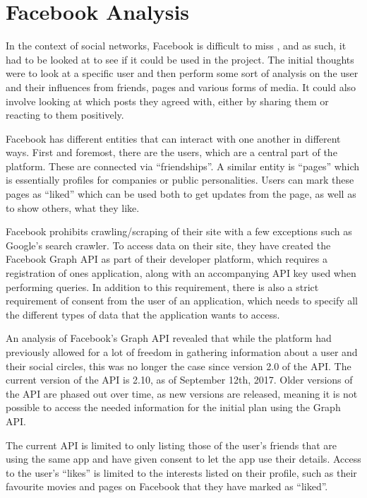 \chapter{Facebook Analysis}\label{chap:facebook-analysis}
In the context of social networks, Facebook is difficult to miss
\citep{FacebookPopularity}, and as such, it had to be looked at to see if it
could be used in the project.
The initial thoughts were to look at a specific user and then perform some sort of analysis on the user and their
influences from friends, pages and various forms of media.
It could also involve looking at which posts they agreed with, either by sharing
them or reacting to them positively.\nl

Facebook has different entities that can interact with one another in different ways.
First and foremost, there are the users, which are a central part of the
platform. These are connected via ``friendships''.
A similar entity is ``pages'' which is essentially profiles for companies or
public personalities.
Users can mark these pages as ``liked'' which can be used both to get updates
from the page, as well as to show others, what they like.\nl

Facebook prohibits crawling/scraping of their site with a few exceptions such as Google's search crawler.
To access data on their site, they have created the Facebook Graph API as part
of their developer platform, which requires a registration of ones application, along with an accompanying API key used when performing queries.
In addition to this requirement, there is also a strict requirement of consent
from the user of an application, which needs to specify all the different types of data that the application wants to access.\nl

An analysis of Facebook's Graph API revealed that while the platform had previously allowed for a lot of freedom in
gathering information about a user and their social circles, this was no longer the case since version 2.0 of the API.
The current version of the API is 2.10, as of September 12th, 2017.
Older versions of the API are phased out over time, as new versions are released, meaning it is not possible to access
the needed information for the initial plan using the Graph
API.\nl

The current API is limited to only listing those of the user's friends that are using the same app and have given
consent to let the app use their details.
Access to the user's ``likes'' is limited to the interests listed on their profile, such as their favourite movies and
pages on Facebook that they have marked as ``liked''.\nl

